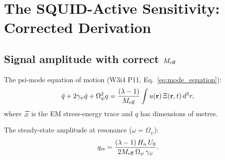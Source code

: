 \documentclass[11pt,twocolumn]{article}
\newcommand{\lam}{\lambda}
\newcommand{\Opsi}{\Omega_\psi}
\newcommand{\gpsi}{\gamma_\psi}
\newcommand{\Meff}{M_{\rm eff}}
\newcommand{\Heff}{H_n}
\newcommand{\Ucav}{U_0}
\theoremstyle{definition}
\theoremstyle{remark}
\begin{document}
\section{The SQUID-Active Sensitivity: Corrected Derivation}
\label{sec:squid_corrected}

\subsection{Signal amplitude with correct $\Meff$}
\label{sec:signal_amplitude}

The psi-mode equation of motion (W3i4 P11, Eq.~\eqref{eq:mode_equation}):
\begin{equation}
\ddot{q} + 2\gpsi\dot{q} + \Opsi^2 q
= \frac{(\lam-1)}{\Meff}\int u(\mathbf{r})\,\Xi(\mathbf{r},t)\,d^3r,
\label{eq:mode_equation}
\end{equation}
where $\Xi$ is the EM stress-energy trace and $q$ has dimensions of metres.

The steady-state amplitude at resonance ($\omega = \Opsi$):
\begin{equation}
q_{\rm ss} = \frac{(\lam-1)\,\Heff\,\Ucav}{2\Meff\,\Opsi\,\gpsi}.
\label{eq:q_ss}
\end{equation}
\end{document}
